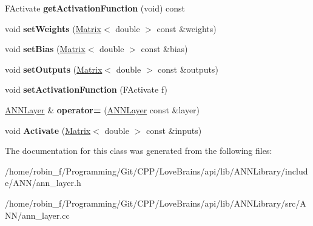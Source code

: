 \begin{DoxyCompactItemize}
\item 
\hypertarget{class_g_a_n_n_1_1_a_n_n_layer_ac6177070fe7bb18aeed82980b70894e1}{}F\+Activate {\bfseries get\+Activation\+Function} (void) const \label{class_g_a_n_n_1_1_a_n_n_layer_ac6177070fe7bb18aeed82980b70894e1}

\item 
\hypertarget{class_g_a_n_n_1_1_a_n_n_layer_a99b44245e660160e6431f4bd8b7cf8ed}{}void {\bfseries set\+Weights} (\hyperlink{class_g_a_n_n_1_1_matrix}{Matrix}$<$ double $>$ const \&weights)\label{class_g_a_n_n_1_1_a_n_n_layer_a99b44245e660160e6431f4bd8b7cf8ed}

\item 
\hypertarget{class_g_a_n_n_1_1_a_n_n_layer_a33b17fa33318cc5ab3060025ccf90faf}{}void {\bfseries set\+Bias} (\hyperlink{class_g_a_n_n_1_1_matrix}{Matrix}$<$ double $>$ const \&bias)\label{class_g_a_n_n_1_1_a_n_n_layer_a33b17fa33318cc5ab3060025ccf90faf}

\item 
\hypertarget{class_g_a_n_n_1_1_a_n_n_layer_a7249be13922695f54aa3ed0b888584b8}{}void {\bfseries set\+Outputs} (\hyperlink{class_g_a_n_n_1_1_matrix}{Matrix}$<$ double $>$ const \&outputs)\label{class_g_a_n_n_1_1_a_n_n_layer_a7249be13922695f54aa3ed0b888584b8}

\item 
\hypertarget{class_g_a_n_n_1_1_a_n_n_layer_afee60047b0ccb6d2b92f75d4b55febdc}{}void {\bfseries set\+Activation\+Function} (F\+Activate f)\label{class_g_a_n_n_1_1_a_n_n_layer_afee60047b0ccb6d2b92f75d4b55febdc}

\item 
\hypertarget{class_g_a_n_n_1_1_a_n_n_layer_af0143b0bacad70f0fc69969e31f60abb}{}\hyperlink{class_g_a_n_n_1_1_a_n_n_layer}{A\+N\+N\+Layer} \& {\bfseries operator=} (\hyperlink{class_g_a_n_n_1_1_a_n_n_layer}{A\+N\+N\+Layer} const \&layer)\label{class_g_a_n_n_1_1_a_n_n_layer_af0143b0bacad70f0fc69969e31f60abb}

\item 
\hypertarget{class_g_a_n_n_1_1_a_n_n_layer_aa8388e643e0916ad8366bb8abc227331}{}void {\bfseries Activate} (\hyperlink{class_g_a_n_n_1_1_matrix}{Matrix}$<$ double $>$ const \&inputs)\label{class_g_a_n_n_1_1_a_n_n_layer_aa8388e643e0916ad8366bb8abc227331}

\end{DoxyCompactItemize}


The documentation for this class was generated from the following files\+:\begin{DoxyCompactItemize}
\item 
/home/robin\+\_\+f/\+Programming/\+Git/\+C\+P\+P/\+Love\+Brains/api/lib/\+A\+N\+N\+Library/include/\+A\+N\+N/ann\+\_\+layer.\+h\item 
/home/robin\+\_\+f/\+Programming/\+Git/\+C\+P\+P/\+Love\+Brains/api/lib/\+A\+N\+N\+Library/src/\+A\+N\+N/ann\+\_\+layer.\+cc\end{DoxyCompactItemize}

